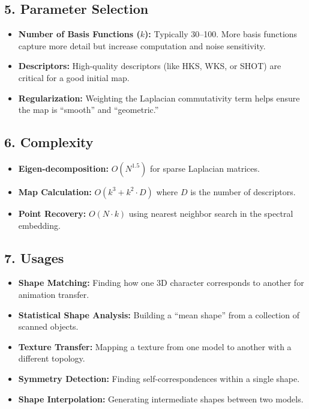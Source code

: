 \subsection{5. Parameter Selection}

\begin{itemize}
    \item \textbf{Number of Basis Functions ($k$):} Typically 30--100. More basis functions capture more detail but increase computation and noise sensitivity.
    \item \textbf{Descriptors:} High-quality descriptors (like HKS, WKS, or SHOT) are critical for a good initial map.
    \item \textbf{Regularization:} Weighting the Laplacian commutativity term helps ensure the map is ``smooth'' and ``geometric.''
\end{itemize}

\subsection{6. Complexity}

\begin{itemize}
    \item \textbf{Eigen-decomposition:} $O(N^{1.5})$ for sparse Laplacian matrices.
    \item \textbf{Map Calculation:} $O(k^3 + k^2 \cdot D)$ where $D$ is the number of descriptors.
    \item \textbf{Point Recovery:} $O(N \cdot k)$ using nearest neighbor search in the spectral embedding.
\end{itemize}

\subsection{7. Usages}

\begin{itemize}
    \item \textbf{Shape Matching:} Finding how one 3D character corresponds to another for animation transfer.
    \item \textbf{Statistical Shape Analysis:} Building a ``mean shape'' from a collection of scanned objects.
    \item \textbf{Texture Transfer:} Mapping a texture from one model to another with a different topology.
    \item \textbf{Symmetry Detection:} Finding self-correspondences within a single shape.
    \item \textbf{Shape Interpolation:} Generating intermediate shapes between two models.
\end{itemize}

